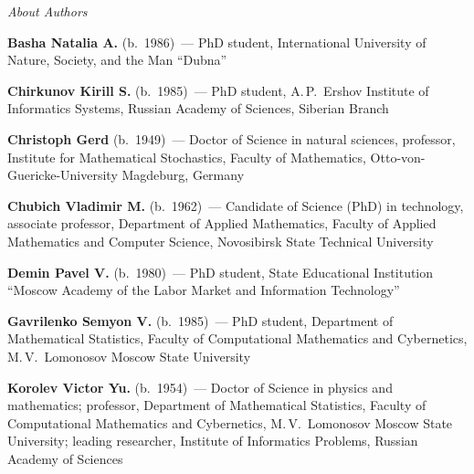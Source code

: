 \begin{center}\LARGE
\textit{About Authors}
\end{center}
\thispagestyle{empty}

\vspace*{48pt}

\begin{multicols}{2}


\noindent
\textbf{Basha Natalia A.} (b.\ 1986)~--- 
PhD student, International University of Nature, Society, and the Man ``Dubna''

\vspace*{3pt}

\noindent
\textbf{Chirkunov Kirill S.} (b.\ 1985)~--- PhD student, A.\,P.~Ershov 
Institute of Informatics Systems, Russian Academy of Sciences, Siberian Branch

\vspace*{3pt}

\noindent
\textbf{Christoph Gerd}  (b.\ 1949)~--- Doctor of Science in natural sciences, 
professor, Institute for Mathematical Stochastics, 
Faculty of Mathematics,  Otto-von-Guericke-University Magdeburg, Germany

\vspace*{3pt}
\noindent
\textbf{Chubich Vladimir M.} (b.\ 1962)~--- Candidate of Science (PhD) in 
technology, associate professor, Department of Applied Mathematics, 
Faculty of Applied Mathematics and Computer Science, Novosibirsk State 
Technical University

\vspace*{3pt}

\noindent
\textbf{Demin Pavel V.} (b.\ 1980)~--- PhD student, State Educational Institution
``Moscow Academy of the Labor Market and Information Technology''

\vspace*{3pt}

\noindent
\textbf{Gavrilenko Semyon V.} (b.\ 1985)~--- PhD student, Department of
Mathematical Statistics, Faculty of Computational Mathematics and
Cybernetics, M.\,V.~Lomonosov Moscow State University

\vspace*{3pt}

\noindent
\textbf{Korolev Victor Yu.}  (b.\ 1954)~--- Doctor of Science in physics and mathematics;
professor, Department of Mathematical Statistics, 
Faculty of Computational Mathematics and Cybernetics, M.\,V.~Lomonosov Moscow State University;
leading researcher, Institute of Informatics Problems, Russian Academy of Sciences


\end{multicols}

